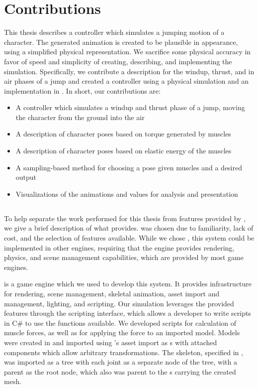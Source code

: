 \section{Contributions}
	This thesis describes a controller which simulates a jumping motion of a character.  The generated animation is created to be plausible in appearance, using a simplified physical representation.  We sacrifice some physical accuracy in favor of speed and simplicity of creating, describing, and implementing the simulation.  Specifically, we contribute a description for the windup, thrust, and in air phases of a jump and created a controller using a physical simulation and an implementation in \unity{}.  In short, our contributions are:
	\begin{itemize}
		\item A controller which simulates a windup and thrust phase of a jump, moving the character from the ground into the air
		\item A description of character poses based on torque generated by muscles
		\item A description of character poses based on elastic energy of the muscles
		\item A sampling-based method for choosing a pose given muscles and a desired output
		\item Visualizations of the animations and values for analysis and presentation
	\end{itemize}

\subsection{\unity{}}
	To help separate the work performed for this thesis from features provided by \unity{}, we give a brief description of what \unity{} provides.  \unity{} was chosen due to familiarity, lack of cost, and the selection of features available.  While we chose \unity{}, this system could be implemented in other engines, requiring that the engine provides rendering, physics, and scene management capabilities, which are provided by most game engines.
	
	\unity{} is a game engine which we used to develop this system.  It provides infrastructure for rendering, scene management, skeletal animation, asset import and management, lighting, and scripting.  Our simulation leverages the provided features through the \unity{} scripting interface, which allows a developer to write scripts in C\# to use the functions available.  We developed scripts for calculation of muscle forces, as well as for applying the force to an imported model.  Models were created in \maya{} and imported using \unity{}'s asset import as \unity{} s with attached  components which allow arbitrary transformations.  The skeleton, specified in \maya{}, was imported as a tree with each joint as a separate  node of the tree, with a parent  as the root node, which also was parent to the s carrying the created mesh.
	
